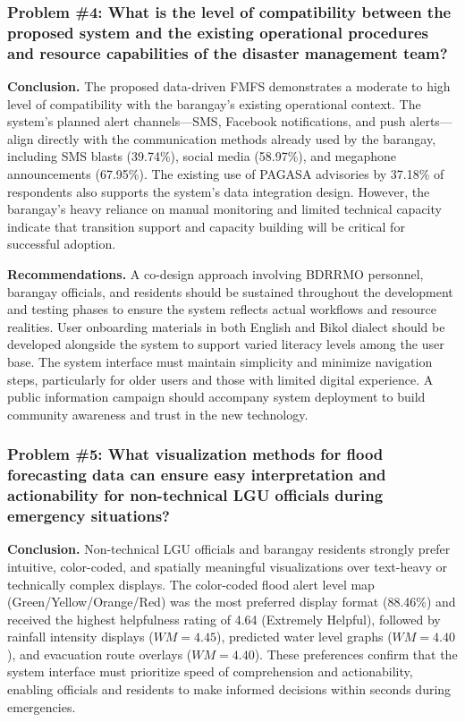 \documentclass{research}
\begin{document}
\subsubsection*{Problem \#4: What is the level of compatibility between the proposed system and the existing operational procedures and resource capabilities of the disaster management team?}

\textbf{Conclusion.} The proposed data-driven FMFS demonstrates a moderate to high
level of compatibility with the barangay's existing operational context. The system's
planned alert channels---SMS, Facebook notifications, and push alerts---align directly
with the communication methods already used by the barangay, including SMS blasts
(39.74\%), social media (58.97\%), and megaphone announcements (67.95\%). The
existing use of PAGASA advisories by 37.18\% of respondents also supports the
system's data integration design. However, the barangay's heavy reliance on manual
monitoring and limited technical capacity indicate that transition support and capacity
building will be critical for successful adoption.

\textbf{Recommendations.} A co-design approach involving BDRRMO personnel,
barangay officials, and residents should be sustained throughout the development and
testing phases to ensure the system reflects actual workflows and resource realities.
User onboarding materials in both English and Bikol dialect should be developed
alongside the system to support varied literacy levels among the user base. The system
interface must maintain simplicity and minimize navigation steps, particularly for older
users and those with limited digital experience. A public information campaign should
accompany system deployment to build community awareness and trust in the new
technology.

\subsubsection*{Problem \#5: What visualization methods for flood forecasting data can ensure easy interpretation and actionability for non-technical LGU officials during emergency situations?}

\textbf{Conclusion.} Non-technical LGU officials and barangay residents strongly
prefer intuitive, color-coded, and spatially meaningful visualizations over text-heavy
or technically complex displays. The color-coded flood alert level map
(Green/Yellow/Orange/Red) was the most preferred display format (88.46\%) and
received the highest helpfulness rating of 4.64 (Extremely Helpful), followed by
rainfall intensity displays ($WM = 4.45$), predicted water level graphs ($WM = 4.40$),
and evacuation route overlays ($WM = 4.40$). These preferences confirm that the
system interface must prioritize speed of comprehension and actionability, enabling
officials and residents to make informed decisions within seconds during emergencies.
\end{document}
